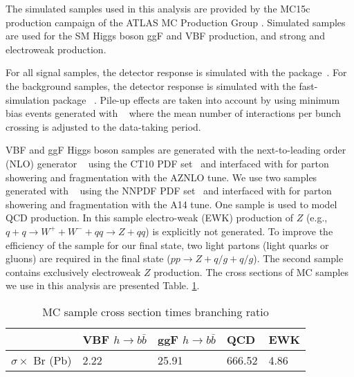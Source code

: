 
The simulated samples used in this analysis are provided by the MC15c
production campaign of the ATLAS MC Production
Group \cite{TWiki_AtlasProductionGroup}. 
Simulated samples are used for the SM Higgs boson
ggF and VBF production, and strong and electroweak \zjets{} production.

For all signal samples, the detector response is simulated with the \geantFour{}
package~\cite{Agostinelli:2002hh}.
For the \zjets{} background samples, the detector response is simulated 
with the fast-simulation
package \atlfastTwo{}~\cite{Richter-Was:683751}.
Pile-up effects are taken into account by using minimum bias events
generated with \pythia{}~\cite{Sjostrand:2014zea} where the mean number of interactions
per bunch crossing is adjusted to the data-taking period.

VBF and ggF Higgs boson samples are generated with the next-to-leading order (NLO)
generator \powheg{}~\cite{Nason:2004rx,Frixione:2007vw,Alioli:2010xd} using the
CT10 PDF set~\cite{Lai:2010vv} and interfaced with \pythia{} for parton showering
and fragmentation with the AZNLO tune.
We use two \zjets{} samples generated with \madgraph{}~\cite{Alwall:2014hca} 
using the NNPDF PDF set~\cite{nnpdf} and interfaced with \pythia{} for parton showering
and fragmentation with the A14 tune. One sample is used to model QCD production.
In this sample electro-weak (EWK) production of $Z$
(e.g., $q+q \rightarrow W^{+} + W^{-} + qq  \rightarrow Z + qq$)
is explicitly not generated. To improve the efficiency of the sample
for our final state, two light partons (light quarks or gluons) are
required in the final state ($pp \rightarrow Z+ q/g + q/g$).
The second sample contains exclusively electroweak $Z$ production.
The cross sections of MC samples we use in this analysis are presented Table. \ref{tab:xsec}.

\begin{table}[]
\centering
\caption{MC sample cross section times branching ratio}
\label{tab:xsec}
\begin{tabular}{|l|l|l|l|l|}
\hline
                   & VBF $h\rightarrow b \bar b$  & ggF $h\rightarrow b \bar b$  & QCD \zjets{} & EWK \zjets{} \\ \hline
$\sigma \times$ Br (Pb) & 2.22 & 25.91 & 666.52         & 4.86         \\ \hline
\end{tabular}
\end{table}
